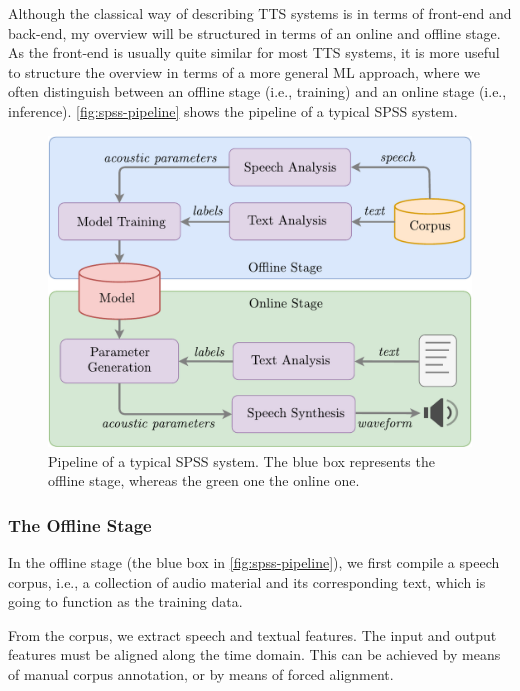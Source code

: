 Although the classical way of describing \ac{TTS} systems is in terms of front-end and back-end, my overview will be structured in terms of an online and offline stage.
As the front-end is usually quite similar for most \ac{TTS} systems, it is more useful to structure the overview in terms of a more general \ac{ML} approach, where we often distinguish between an offline stage (i.e., training) and an online stage (i.e., inference).
\autoref{fig:spss-pipeline} shows the pipeline of a typical \ac{SPSS} system.
 
\vfill
\begin{figure}[h]
    \centering
    \includegraphics[scale=0.7]{figures/spss-pipeline.pdf}
    \caption[SPSS pipeline]{Pipeline of a typical \ac{SPSS} system. The blue box represents the offline stage, whereas the green one the online one.}
    \label{fig:spss-pipeline}
\end{figure}


\subsubsection{The Offline Stage}

In the offline stage (the blue box in \autoref{fig:spss-pipeline}), we first compile a speech corpus, i.e., a collection of audio material and its corresponding text, which is going to function as the training data.

From the corpus, we extract speech and textual features.
The input and output features must be aligned along the time domain.
This can be achieved by means of manual corpus annotation, or by means of forced alignment.

